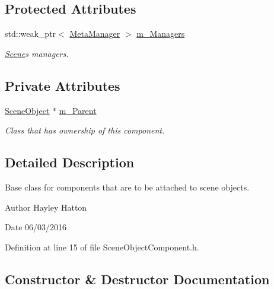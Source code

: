 \subsection*{Protected Attributes}
\begin{DoxyCompactItemize}
\item 
std\+::weak\+\_\+ptr$<$ \hyperlink{class_meta_manager}{Meta\+Manager} $>$ \hyperlink{class_scene_object_component_ae37257f842b003aa25ca634565d2f1e4}{m\+\_\+\+Managers}
\begin{DoxyCompactList}\small\item\em \hyperlink{class_scene}{Scene}\textquotesingle{}s managers. \end{DoxyCompactList}\end{DoxyCompactItemize}
\subsection*{Private Attributes}
\begin{DoxyCompactItemize}
\item 
\hyperlink{class_scene_object}{Scene\+Object} $\ast$ \hyperlink{class_scene_object_component_ad7992ff4976be980767939e44eba2b2f}{m\+\_\+\+Parent}
\begin{DoxyCompactList}\small\item\em Class that has ownership of this component. \end{DoxyCompactList}\end{DoxyCompactItemize}


\subsection{Detailed Description}
Base class for components that are to be attached to scene objects. 

\begin{DoxyAuthor}{Author}
Hayley Hatton 
\end{DoxyAuthor}
\begin{DoxyDate}{Date}
06/03/2016 
\end{DoxyDate}


Definition at line 15 of file Scene\+Object\+Component.\+h.



\subsection{Constructor \& Destructor Documentation}
